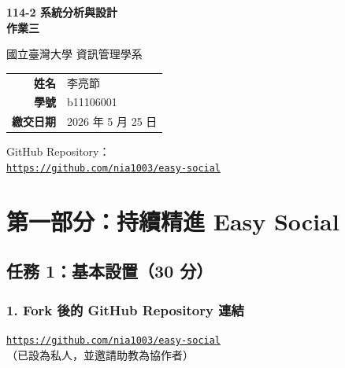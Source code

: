 \documentclass[12pt, a4paper]{article}
\begin{document}
\begin{titlepage}
  \centering
  \vspace*{3cm}
  {\Huge\bfseries 114-2 系統分析與設計\\[0.5em]作業三\par}
  \vspace{2cm}
  {\Large 國立臺灣大學 資訊管理學系\par}
  \vspace{3cm}
  \begin{tabular}{rl}
    \textbf{姓名} & 李亮節 \\[0.5em]
    \textbf{學號} & b11106001 \\[0.5em]
    \textbf{繳交日期} & 2026 年 5 月 25 日 \\
  \end{tabular}
  \vfill
  {\large GitHub Repository：\\[0.3em]
  \href{https://github.com/nia1003/easy-social}{\texttt{https://github.com/nia1003/easy-social}}\par}
\end{titlepage}

\tableofcontents
\newpage

\section*{第一部分：持續精進 Easy Social}

\subsection*{任務 1：基本設置（30 分）}

\subsubsection*{1. Fork 後的 GitHub Repository 連結}

\begin{tcolorbox}[colback=lightblue, colframe=accent, title=Repository 連結]
\href{https://github.com/nia1003/easy-social}{\texttt{https://github.com/nia1003/easy-social}}\\
（已設為私人，並邀請助教為協作者）
\end{tcolorbox}
\end{document}
